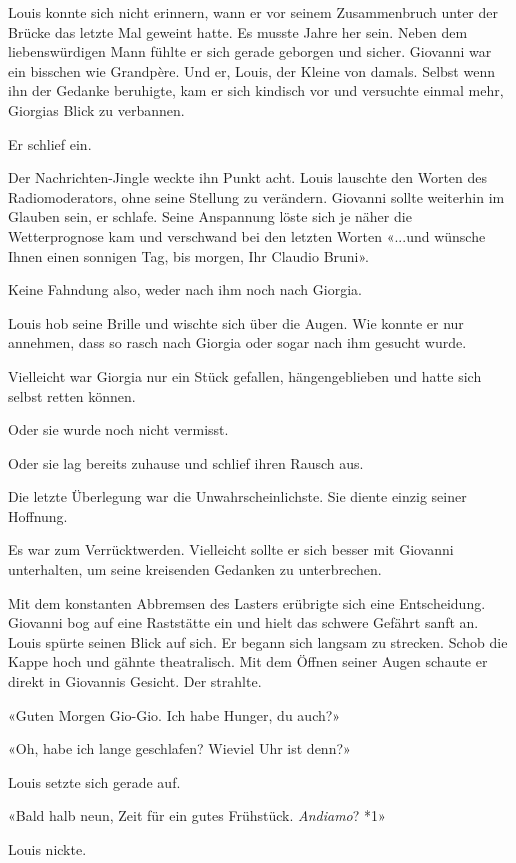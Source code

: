 Louis konnte sich nicht erinnern, wann er vor seinem Zusammenbruch unter
der Brücke das letzte Mal geweint hatte. Es musste Jahre her sein. Neben
dem liebenswürdigen Mann fühlte er sich gerade geborgen und sicher.
Giovanni war ein bisschen wie Grandpère. Und er, Louis, der Kleine von
damals. Selbst wenn ihn der Gedanke beruhigte, kam er sich kindisch vor
und versuchte einmal mehr, Giorgias Blick zu verbannen.

Er schlief ein.

Der Nachrichten-Jingle weckte ihn Punkt acht. Louis lauschte den Worten
des Radiomoderators, ohne seine Stellung zu verändern. Giovanni sollte
weiterhin im Glauben sein, er schlafe. Seine Anspannung löste sich je
näher die Wetterprognose kam und verschwand bei den letzten Worten
«...und wünsche Ihnen einen sonnigen Tag, bis morgen, Ihr Claudio
Bruni».

Keine Fahndung also, weder nach ihm noch nach Giorgia.

Louis hob seine Brille und wischte sich über die Augen. Wie konnte er
nur annehmen, dass so rasch nach Giorgia oder sogar nach ihm gesucht
wurde.

Vielleicht war Giorgia nur ein Stück gefallen, hängengeblieben und hatte
sich selbst retten können.

Oder sie wurde noch nicht vermisst.

Oder sie lag bereits zuhause und schlief ihren Rausch aus.

Die letzte Überlegung war die Unwahrscheinlichste. Sie diente einzig
seiner Hoffnung.

Es war zum Verrücktwerden. Vielleicht sollte er sich besser mit Giovanni
unterhalten, um seine kreisenden Gedanken zu unterbrechen.

Mit dem konstanten Abbremsen des Lasters erübrigte sich eine
Entscheidung. Giovanni bog auf eine Raststätte ein und hielt das schwere
Gefährt sanft an. Louis spürte seinen Blick auf sich. Er begann sich
langsam zu strecken. Schob die Kappe hoch und gähnte theatralisch. Mit
dem Öffnen seiner Augen schaute er direkt in Giovannis Gesicht. Der
strahlte.

«Guten Morgen Gio-Gio. Ich habe Hunger, du auch?»

«Oh, habe ich lange geschlafen? Wieviel Uhr ist denn?»

Louis setzte sich gerade auf.

«Bald halb neun, Zeit für ein gutes Frühstück. \emph{Andiamo}? *1»

Louis nickte.

